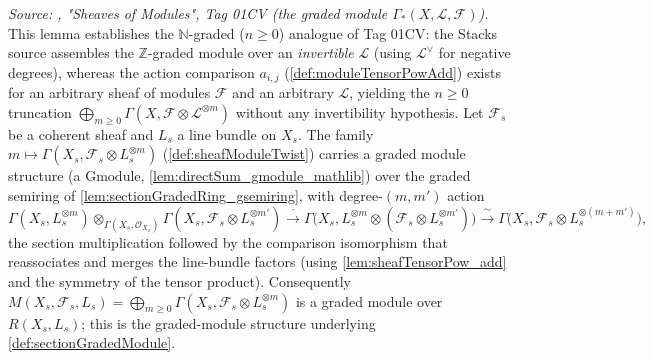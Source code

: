 \begin{lemma}\leanok
  \label{lem:sectionGradedModule_gmodule}
  \textit{Source: \cite{stacks-project}, "Sheaves of Modules", Tag 01CV (the graded
  module \(\Gamma_*(X,\mathcal{L},\mathcal{F})\)).}
  This lemma establishes the \(\mathbb{N}\)-graded (\(n\ge 0\)) analogue of Tag 01CV: the
  Stacks source assembles the \(\mathbb{Z}\)-graded module over an \emph{invertible}
  \(\mathcal{L}\) (using \(\mathcal{L}^\vee\) for negative degrees), whereas the
  action comparison \(a_{i,j}\) (\cref{def:moduleTensorPowAdd}) exists for an
  arbitrary sheaf of modules \(\mathcal{F}\) and an arbitrary \(\mathcal{L}\), yielding
  the \(n\ge 0\) truncation \(\bigoplus_{m\ge 0}\Gamma(X,\mathcal{F}\otimes
  \mathcal{L}^{\otimes m})\) without any invertibility hypothesis.
  Let \(\mathcal{F}_s\) be a coherent sheaf and \(L_s\) a line bundle on
  \(X_s\). The family
  \(m \mapsto \Gamma(X_s, \mathcal{F}_s \otimes L_s^{\otimes m})\)
  (\cref{def:sheafModuleTwist}) carries a graded module structure (a
  \(\mathrm{Gmodule}\), \cref{lem:directSum_gmodule_mathlib}) over the graded
  semiring of \cref{lem:sectionGradedRing_gsemiring}, with degree-\((m,m')\)
  action
  \[
    \Gamma(X_s, L_s^{\otimes m}) \otimes_{\Gamma(X_s,\mathcal{O}_{X_s})}
      \Gamma(X_s, \mathcal{F}_s \otimes L_s^{\otimes m'})
    \xrightarrow{\ \cdot\ }
    \Gamma\bigl(X_s, L_s^{\otimes m} \otimes
      (\mathcal{F}_s \otimes L_s^{\otimes m'})\bigr)
    \xrightarrow{\ \sim\ }
    \Gamma\bigl(X_s, \mathcal{F}_s \otimes L_s^{\otimes (m+m')}\bigr),
  \]
  the section multiplication followed by the comparison isomorphism that
  reassociates and merges the line-bundle factors (using
  \cref{lem:sheafTensorPow_add} and the symmetry of the tensor product).
  Consequently \(M(X_s, \mathcal{F}_s, L_s) = \bigoplus_{m \ge 0}
  \Gamma(X_s, \mathcal{F}_s \otimes L_s^{\otimes m})\) is a graded module over
  \(R(X_s, L_s)\); this is the graded-module structure underlying
  \cref{def:sectionGradedModule}.
\end{lemma}

